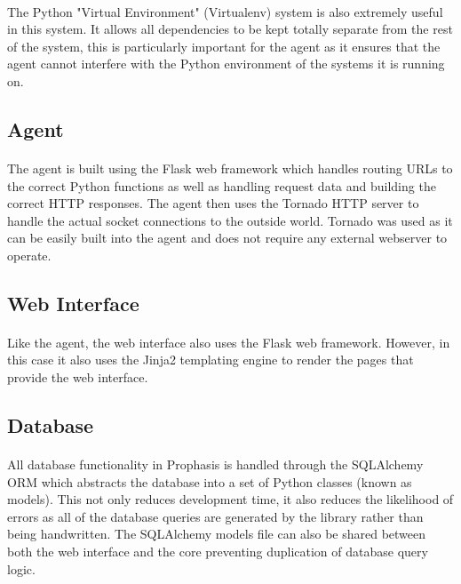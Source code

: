 \documentclass[bsc,logo,twoside]{infthesis}
\begin{document}
\paragraph*{}
	The Python "Virtual Environment" (Virtualenv) system is also extremely useful
	in this system.  It allows all dependencies to be kept totally separate from
	the rest of the system, this is particularly important for the agent as it
	ensures that the agent cannot interfere with the Python environment of the
	systems it is running on.
	
\subsection{Agent}
\paragraph*{}
	The agent is built using the Flask web framework which handles routing URLs to
	the correct Python functions as well as handling request data and building the
	correct HTTP responses.  The agent then uses the Tornado HTTP server to handle
	the actual socket connections to the outside world.  Tornado was used as it
	can be easily built into the agent and does not require any external webserver
	to operate.
	
\subsection{Web Interface}
\paragraph*{}
	Like the agent, the web interface also uses the Flask web framework.  However,
	in this case it also uses the Jinja2 templating engine to render the pages
	that provide the web interface.
	
\subsection{Database}
\paragraph*{}
	All database functionality in Prophasis is handled through the SQLAlchemy ORM
	which abstracts the database into a set of Python classes (known as models). 
	This not only reduces development time, it also reduces the likelihood of
	errors as all of the database queries are generated by the library rather than
	being handwritten.  The SQLAlchemy models file can also be shared between both
	the web interface and the core preventing duplication of database query logic.
	
\end{document}
